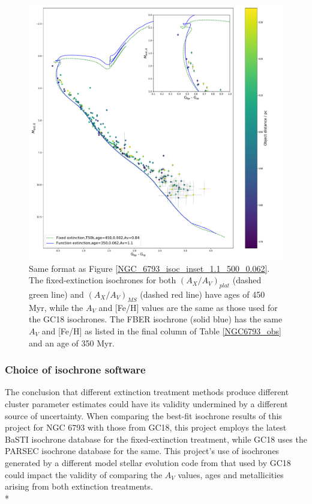\documentclass[12pt, a4paper]{report}
\begin{document}
\begin{figure}[h!]
\begin{center}
\includegraphics[width=1.0\textwidth]{../NGC_6793_CMD_FeH_0p062_Av_1p1_350Myr_vizier_isochrones_summary_errorbars.pdf}
\caption{Same format as Figure \ref{NGC_6793_isoc_inset_1.1_500_0.062}. The fixed-extinction isochrones for both $(A_{X}/A_{V})_{plat}$ (dashed green line) and $(A_{X}/A_{V})_{MS}$ (dashed red line) have ages of 450 Myr, while the $A_{V}$ and [Fe/H] values are the same as those used for the GC18 isochrones. The FBER isochrone (solid blue) has the same $A_{V}$ and [Fe/H] as listed in the final column of Table \ref{NGC6793_obs} and an age of 350 Myr.}
\label{NGC_6793_bossini}
\end{center}
\end{figure}

\subsubsection{Choice of isochrone software}

The conclusion that different extinction treatment methods produce different cluster parameter estimates could have its validity undermined by a different source of uncertainty. When comparing the best-fit isochrone results of this project for NGC 6793 with those from GC18, this project employs the latest BaSTI isochrone database \citep{2018ApJ...856..125H} for the fixed-extinction treatment, while GC18 uses the PARSEC isochrone database \citep{2017ApJ...835...77M} for the same. This project's use of isochrones generated by a different model stellar evolution code from that used by GC18 could impact the validity of comparing the $A_{V}$ values, ages and metallicities arising from both extinction treatments.\\*
\end{document}
